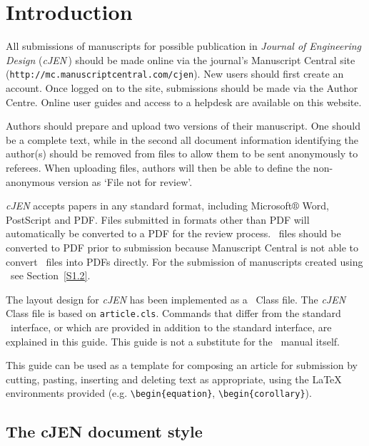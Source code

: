 \documentclass[]{cJEN2e}
\begin{document}

\section{Introduction}

All submissions of manuscripts for possible publication in {\itshape Journal of Engineering Design} ({\it cJEN}\,)  should be made online via the journal's Manuscript Central site ({\tt{http://mc.manuscriptcentral.com/cjen}}). New users should first create an account. Once logged on to the site, submissions should be made via the Author Centre. Online user guides and access to a helpdesk are available on this website.

Authors should prepare and upload two versions of their manuscript. One should be a complete text, while in the second all document information identifying the author(s) should be removed from files to allow them to be sent anonymously to referees. When uploading files, authors will then be able to define the non-anonymous version as `File not for review'.

{\it cJEN} accepts papers in any standard format, including Microsoft$\circledR$ Word, PostScript and PDF. Files submitted in formats other than PDF will automatically be converted to a PDF for the review process. \LaTeXe\ files should be converted to PDF prior to submission because Manuscript Central is not able to convert \LaTeXe\ files into PDFs directly. For the submission of manuscripts created using \LaTeXe\, see Section~\ref{S1.2}.

The layout design for {\it cJEN} has been implemented as a \LaTeXe\ Class file. The {\it cJEN} Class file is
based on {\tt article.cls}. Commands that differ from the standard \LaTeXe\ interface, or which are provided in
addition to the standard interface, are explained in this guide. This guide is not a substitute for the \LaTeXe\
manual itself.

This guide can be used as a template for composing an article for submission by cutting, pasting, inserting and
deleting text as appropriate, using the LaTeX environments provided (e.g. \verb"\begin{equation}",
\verb"\begin{corollary}").\vspace{6pt}

\subsection{The {\bi cJEN} document style}
\end{document}
